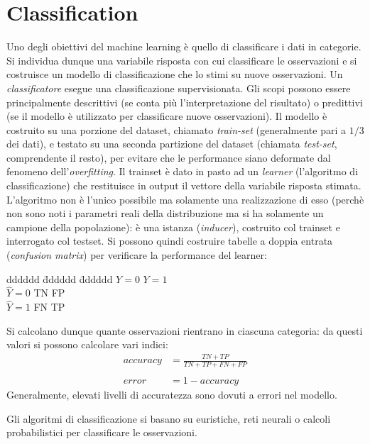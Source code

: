 \documentclass[11pt, a4page, twocolumn]{article}
\begin{document}
\part{Classification}
Uno degli obiettivi del machine learning è quello di classificare i dati in categorie.
Si individua dunque una variabile risposta con cui classificare le osservazioni e si costruisce un modello di classificazione che lo stimi su nuove osservazioni.
Un \textit{classificatore} esegue una classificazione supervisionata.
Gli scopi possono essere principalmente descrittivi (se conta più l'interpretazione del risultato) o predittivi (se il modello è utilizzato per classificare nuove osservazioni).
Il modello è costruito su una porzione del dataset, chiamato \textit{train-set} (generalmente pari a $1/3$ dei dati), e testato su una seconda partizione del dataset (chiamata \textit{test-set}, comprendente il resto), per evitare che le performance siano deformate dal fenomeno dell'\textit{overfitting}.
Il trainset è dato in pasto ad un \textit{learner} (l'algoritmo di classificazione) che restituisce in output il vettore della variabile risposta stimata.
L'algoritmo non è l'unico possibile ma solamente una realizzazione di esso (perchè non sono noti i parametri reali della distribuzione ma si ha solamente un campione della popolazione): è una istanza (\textit{inducer}), costruito col trainset e interrogato col testset.
Si possono quindi costruire tabelle a doppia entrata (\textit{confusion matrix}) per verificare la performance del learner:
\begin{tabbing}
  dddddd \= dddddd \= dddddd \kill
              \> $Y=0$ \> $Y=1$   \\
  $\hat{Y}=0$ \> TN    \> FP      \\
  $\hat{Y}=1$ \> FN    \> TP      \\
\end{tabbing}
Si calcolano dunque quante osservazioni rientrano in ciascuna categoria: da questi valori si possono calcolare vari indici:
\begin{align*}
  accuracy &= \frac{TN + TP}{TN + TP + FN + FP} \\  \\
  error &= 1 - accuracy
\end{align*}
Generalmente, elevati livelli di accuratezza sono dovuti a errori nel modello.

Gli algoritmi di classificazione si basano su euristiche, reti neurali o calcoli probabilistici per classificare le osservazioni.
\end{document}

